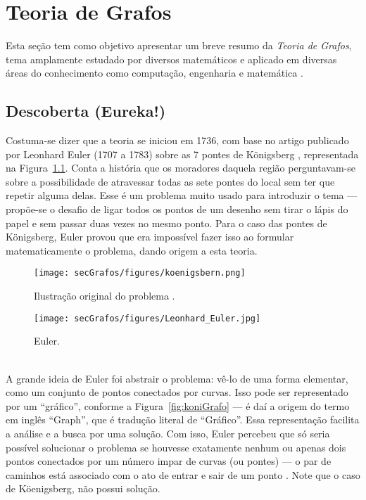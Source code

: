 \chapter{Teoria de Grafos\label{ap:grafos}}
Esta seção tem como objetivo apresentar um breve resumo da \textit{Teoria de Grafos}, tema amplamente estudado por diversos matemáticos e aplicado em diversas áreas do conhecimento como computação, engenharia e matemática \cite{graphTheoryApplicationsBondy}.

\section{Descoberta (Eureka!)}
Costuma-se dizer que a teoria se iniciou em 1736, com base no artigo publicado por Leonhard Euler (1707 a 1783) sobre as 7 pontes de Königsberg \cite{euler:KOENIGSBERG}, representada na Figura~\ref{fig:koni}. Conta a história que os moradores daquela região perguntavam-se sobre a possibilidade de atravessar todas as sete pontes do local sem ter que repetir alguma delas. Esse é um problema muito usado para introduzir o tema \cite{problemsInMath} --- propõe-se o desafio de ligar todos os pontos de um desenho sem tirar o lápis do papel e sem passar duas vezes no mesmo ponto. Para o caso das pontes de Königsberg, Euler provou que era impossível fazer isso ao formular matematicamente o problema, dando origem a esta teoria.

\begin{minipage}{0.60 \linewidth}
	\begin{figure}[H]
		\begin{center}
			\texttt{[image: secGrafos/figures/koenigsbern.png]}
		\end{center}
		\caption{Ilustração original do problema \cite{euler:KOENIGSBERG}.}
		\label{fig:koni}
	\end{figure}
\end{minipage}
\hspace{0.1cm}
\begin{minipage}{0.35 \linewidth}
	\begin{figure}[H]
		\begin{center}
			\texttt{[image: secGrafos/figures/Leonhard\_Euler.jpg]}
		\end{center}
		\caption{Euler.}
		\label{fig:euler}
	\end{figure}
\end{minipage}
\\

A grande ideia de Euler foi abstrair o problema: vê-lo de uma forma elementar, como um conjunto de pontos conectados por curvas. Isso pode ser representado por um ``gráfico'', conforme a Figura~\ref{fig:koniGrafo} --- é daí a origem do termo em inglês ``Graph'', que é tradução literal de ``Gráfico''. Essa representação facilita a análise e a busca por uma solução. Com isso, Euler percebeu que só seria possível solucionar o problema se houvesse exatamente nenhum ou apenas dois pontos conectados por um número impar de curvas (ou pontes) --- o par de caminhos está associado com o ato de entrar e sair de um ponto \cite{euler:KOENIGSBERG}. Note que o caso de Köenigsberg, não possui solução.

